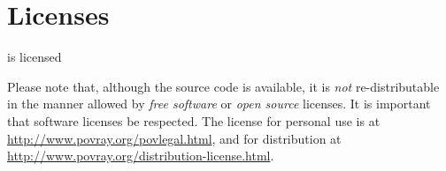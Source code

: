 \chapter{Licenses}%
\label{chap:licenses}

	\IXpkgu{} is licensed
	
	Please note that, although the source code is available,
	it is \emph{not} re-distributable in the manner allowed
	by \emph{free software} or \emph{open source} licenses.
	It is important that software licenses be respected.
	The \IXpov{} license for personal use is at
	\url{http://www.povray.org/povlegal.html}, and for distribution
	at \url{http://www.povray.org/distribution-license.html}.

